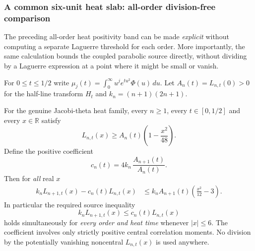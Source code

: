 \subsubsection{A common six-unit heat slab: all-order division-free comparison}
\label{subsec:sixbanddivisionfree}
The preceding all-order heat positivity band can be made
\emph{explicit} without computing a separate Laguerre
threshold for each order. More importantly, the same
calculation bounds the coupled parabolic source directly,
without dividing by a Laguerre expression at a point
where it might be small or vanish.

For $0\le t\le1/2$ write
$\mu_j(t)=\int_0^\infty u^j e^{tu^2}\Phi(u)\,du$.
Let $A_n(t)=L_{n,t}(0)>0$ for the half-line transform
$H_t$ and $k_n=(n+1)(2n+1)$.

\begin{theorem}
\label{thm:sixband}
For the genuine Jacobi-theta heat family,
every $n\ge1$, every $t\in[0,1/2]$ and
every $x\in\mathbb R$ satisfy
\begin{equation}\label{eq:sixbandlower}
\boxed{
L_{n,t}(x)\ge
A_n(t)\left(1-\frac{x^2}{48}\right).}
\end{equation}
Define the positive coefficient
\[
c_n(t)=4k_n\,\frac{A_{n+1}(t)}{A_n(t)}.
\]
Then for \emph{all} real $x$
\begin{equation}\label{eq:sixbandresidual}
\boxed{\begin{aligned}
k_nL_{n+1,t}(x)-c_n(t)L_{n,t}(x)
&\le k_nA_{n+1}(t)
\left(\frac{x^2}{12}-3\right).
\end{aligned}}
\end{equation}
In particular the required source inequality
\begin{equation}\label{eq:sixbandsource}
\boxed{k_nL_{n+1,t}(x)\le
c_n(t)L_{n,t}(x)}
\end{equation}
holds simultaneously for \emph{every order and heat time}
whenever $|x|\le6$.
The coefficient involves only strictly positive
central correlation moments. No division by the
potentially vanishing noncentral $L_{n,t}(x)$
is used anywhere.

\end{theorem}
